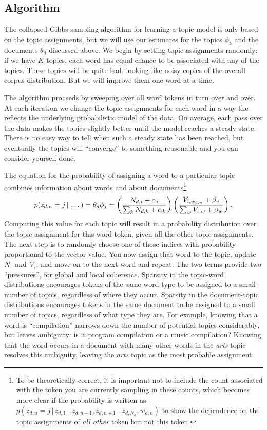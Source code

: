 \subsection{Algorithm}

The collapsed Gibbs sampling algorithm for learning a topic model is
only based on the topic assignments, but we will use our estimates for
the topics $\phi_k$ and the documents $\theta_d$ discussed above.  We
begin by setting topic assignments randomly: if we have $K$ topics,
each word has equal chance to be associated with any of the topics.
These topics will be quite bad, looking like noisy copies of the
overall corpus distribution. But we will improve them one word at a
time.

The algorithm proceeds by sweeping over all word tokens in turn over and over.
At each iteration we change the topic assignments for each word in a way the reflects the
underlying probabilistic model of the data.  On average, each pass over the data makes the
topics slightly better until the model reaches a steady state.  There is no easy way
to tell when such a steady state has been reached, but eventually the topics will ``converge'' to something reasonable and you can consider yourself done.

The equation for the probability of assigning a word to a particular topic
combines information about words and about documents\footnote{To be theoretically correct, it is important
not to include the count associated with the token you are currently sampling in
these counts, which becomes more clear if the probability is written as
$p(z_{d,n}=j\,|\,z_{d,1}\dots z_{d,n-1},z_{d,n+1}\dots z_{d,N_d}, w_{d,n})$ to
show the dependence on the topic assignments of \emph{all other} token but not
this token.}
\begin{align}
p(z_{d,n}=j \, | \, \dots) = \theta_d
\phi_j = \left(\frac{N_{d,i} + \alpha_i}{\sum_k N_{d,k} + \alpha_k} \right) \left( \frac{V_{i,w_{d,n}} + \beta_v}{\sum_w V_{i,w} +
    \beta_w} \right).
\label{eq:sampling}
\end{align}
Computing this value for each topic will result in a probability distribution over the topic assignment for this word token, given all the other topic assignments.  The next step is to randomly choose one of those indices with
probability proportional to the vector value.  You now assign that word to the
topic, update $N_{,}$ and $V_{,}$, and move on to the next word and repeat.
The two terms provide two ``pressures'', for global and local coherence. Sparsity in the topic-word distributions encourages tokens of the same word type to be assigned to a small number of topics,  regardless of where they occur. Sparsity in the document-topic distributions encourages tokens in the same document to be assigned to a small number of topics, regardless of what type they are.
For example, knowing that a word is ``compilation'' narrows down the number of potential topics considerably, but leaves ambiguity: is it program compilation or a music compilation? Knowing that the word occurs in a document with many other words in the \emph{arts} topic resolves this ambiguity, leaving the \emph{arts} topic as the most probable assignment.


